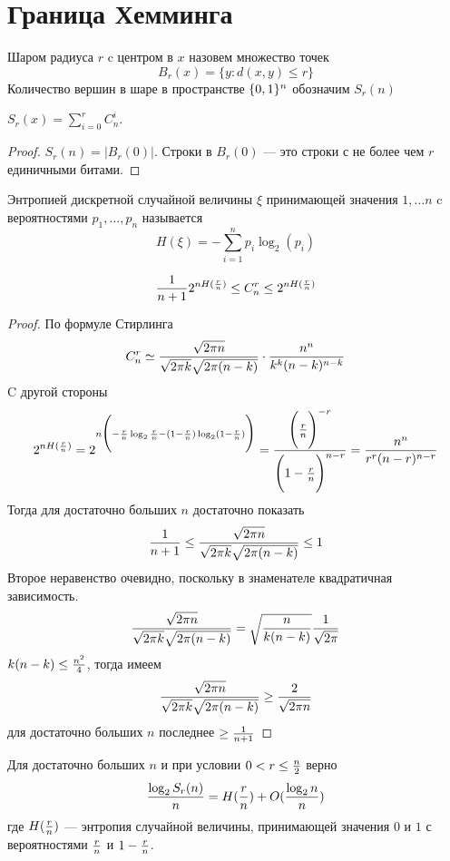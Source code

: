 \section{Граница Хемминга}

\begin{definition}
Шаром радиуса $r$ c центром в $x$ назовем множество точек 
$$B_{r} (x) = \{y \colon d(x,y) \le r\}$$
Количество вершин в шаре в пространстве $\{0,1\}^n$ обозначим $S_r(n)$
\end{definition}

\begin{remark}
$S_r(x) = \sum\limits_{i=0}^r C_n^i$.
\end{remark}
\begin{proof}
$S_r(n) = |B_r(0)|$. Строки в $B_r(0)$ --- это строки с не более чем $r$ 
единичными битами.
\end{proof}

\begin{definition}
Энтропией дискретной случайной величины $\xi$ принимающей значения $1, \ldots n$
c вероятностями $p_1, \ldots, p_n$ называется
$$H(\xi) = -\sum\limits_{i=1}^n p_i \log_2 (p_i)$$
\end{definition}

\begin{lemma}
$${1 \over n+1} 2^{n H({r \over n})} \le C_n^r \le 2^{n H({r \over n})}$$
\end{lemma}
\begin{proof}
По формуле Стирлинга $$C_n^r \simeq {\sqrt{2\pi n} \over \sqrt{2\pi k} \sqrt{2\pi (n-k)}}
\cdot {n^n \over k^k (n-k)^{n-k}}$$
C другой стороны
$$2^{nH({r \over n})} = 2^{n\Bigg(-{r \over n} \log_2 {r \over n} - (1-{r \over n}) 
\log_2 (1- {r\over n})\Bigg)} = {\Bigg({r \over n}\Bigg)^{-r} \over 
\Bigg(1-{r\over n}\Bigg)^{n-r}} = {n^n \over r^r (n-r)^{n-r}}$$
Тогда для достаточно больших $n$ достаточно показать
$${1 \over n+1} \le {\sqrt{2\pi n} \over \sqrt{2\pi k} \sqrt{2\pi (n-k)}} \le 1$$
Второе неравенство очевидно, поскольку в знаменателе квадратичная зависимость.
$$ {\sqrt{2\pi n} \over \sqrt{2\pi k} \sqrt{2\pi (n-k)}} = \sqrt{n \over k (n-k)} 
{1 \over \sqrt{2 \pi}}$$
$k (n-k) \le {n^2 \over 4}$, тогда имеем
$$  {\sqrt{2\pi n} \over \sqrt{2\pi k} \sqrt{2\pi (n-k)}} \ge {2 \over \sqrt{2 \pi n}}$$
для достаточно больших $n$ последнее $\ge {1 \over n+1}$
\end{proof}

\begin{theorem}
Для достаточно больших $n$ и при условии $0 < r \le {n \over 2}$ верно
$${\log_2 S_r(n) \over n} = H({r \over n}) + O({\log_2 n \over n})$$
где $H({r\over n})$ --- энтропия случайной величины, принимающей значения
$0$ и $1$ с вероятностями ${r\over n}$ и $1 - {r \over n}$.
\end{theorem}

